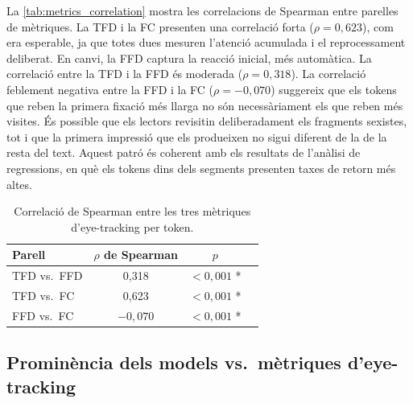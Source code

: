 La \autoref{tab:metrics_correlation} mostra les correlacions de Spearman entre parelles de mètriques.
La TFD i la FC presenten una correlació forta ($\rho = 0,623$), com era esperable, ja que totes dues mesuren l'atenció acumulada i el reprocessament deliberat. En canvi, la FFD captura la reacció inicial, més automàtica.
La correlació entre la TFD i la FFD és moderada ($\rho = 0,318$).
La correlació feblement negativa entre la FFD i la FC ($\rho = -0,070$) suggereix que els tokens que reben la primera fixació més llarga no són necessàriament els que reben més visites.
És possible que els lectors revisitin deliberadament els fragments sexistes, tot i que la primera impressió que els produeixen no sigui diferent de la de la resta del text.
Aquest patró és coherent amb els resultats de l'anàlisi de regressions, en què els tokens dins dels segments presenten taxes de retorn més altes.
\iftables
\begin{table}[htbp]
\small
\centering
\begin{tabular}{lccr}
\toprule
\textbf{Parell} & \textbf{$\rho$ de Spearman} & \textbf{$p$} \\
\midrule
TFD vs.\ FFD & 0,318 & $< 0,001$ * \\
TFD vs.\ FC  & 0,623 & $< 0,001$ * \\
FFD vs.\ FC  & $-0,070$ & $< 0,001$ * \\
\bottomrule
\end{tabular}
\caption{Correlació de Spearman entre les tres mètriques d'eye-tracking per token.}
\label{tab:metrics_correlation}
\end{table}
\fi

\subsection{Prominència dels models vs.\ mètriques d'eye-tracking}

